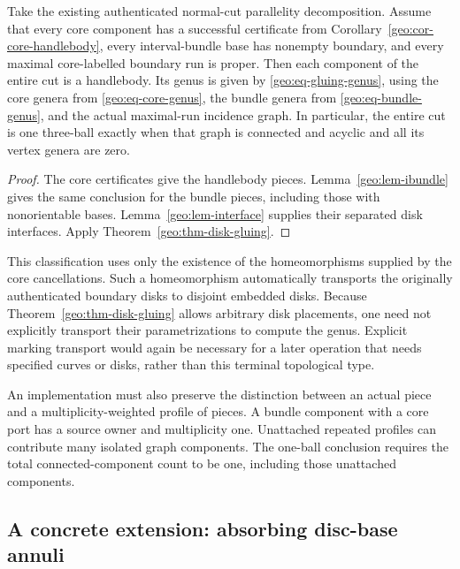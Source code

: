 \begin{corollary}
\label{geo:cor-normal-cut-classifier}
Take the existing authenticated normal-cut parallelity decomposition.
Assume that every core component has a successful certificate from
Corollary~\ref{geo:cor-core-handlebody}, every interval-bundle base has
nonempty boundary, and every maximal core-labelled boundary run is proper.
Then each component of the entire cut is a handlebody.  Its genus is given
by \eqref{geo:eq-gluing-genus}, using the core genera from
\eqref{geo:eq-core-genus}, the bundle genera from
\eqref{geo:eq-bundle-genus}, and the actual maximal-run incidence graph.
In particular, the entire cut is one three-ball exactly when that graph is
connected and acyclic and all its vertex genera are zero.
\end{corollary}

\begin{proof}
The core certificates give the handlebody pieces.  Lemma~\ref{geo:lem-ibundle}
gives the same conclusion for the bundle pieces, including those with
nonorientable bases.  Lemma~\ref{geo:lem-interface} supplies their separated
disk interfaces.  Apply Theorem~\ref{geo:thm-disk-gluing}.
\end{proof}

This classification uses only the existence of the homeomorphisms supplied
by the core cancellations.  Such a homeomorphism automatically transports
the originally authenticated boundary disks to disjoint embedded disks.
Because Theorem~\ref{geo:thm-disk-gluing} allows arbitrary disk placements,
one need not explicitly transport their parametrizations to compute the
genus.  Explicit marking transport would again be necessary for a later
operation that needs specified curves or disks, rather than this terminal
topological type.

An implementation must also preserve the distinction between an actual
piece and a multiplicity-weighted profile of pieces.  A bundle component
with a core port has a source owner and multiplicity one.  Unattached
repeated profiles can contribute many isolated graph components.  The
one-ball conclusion requires the total connected-component count to be
one, including those unattached components.

\subsection{A concrete extension: absorbing disc-base annuli}
\label{geo:annulus-absorption}

